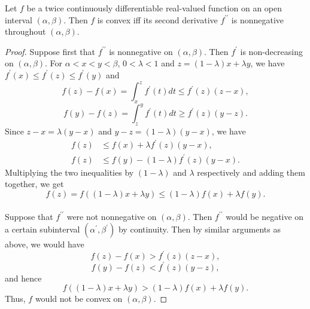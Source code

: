 \documentclass[11pt,a4paper]{article}
\begin{document}
\begin{theorem}\label{thm:convex_function_second_order}
    Let $f$ be a twice continuously differentiable real-valued function on an open interval $(\alpha,\beta)$. Then $f$ is convex iff its second derivative $f^{\prime\prime}$ is nonnegative throughout $(\alpha,\beta)$.
\end{theorem}

\begin{proof}
    \converse Suppose first that $f^{\prime\prime}$ is nonnegative on $(\alpha,\beta)$. Then $f^\prime$ is non-decreasing on $(\alpha,\beta)$. For $\alpha<x<y<\beta$, $0<\lambda<1$ and $z = (1-\lambda)x+\lambda y$, we have $f^\prime(x)\le f^\prime (z)\le f^\prime(y)$ and
    \begin{equation*}
        f(z) - f(x) = \int_x^z f^\prime (t)dt \le f^\prime(z)(z-x), 
    \end{equation*}
    \begin{equation*}
        f(y) - f(z) = \int_z^y f^\prime (t)dt \ge f^\prime(z)(y-z). 
    \end{equation*}
    Since $z-x = \lambda(y-x)$ and $y-z = (1-\lambda)(y-x)$, we have
    \begin{align*}
        f(z)&\le f(x) + \lambda f^\prime(z)(y-x),\\
        f(z)&\le f(y) - (1-\lambda) f^\prime(z)(y-x).
    \end{align*}
    Multiplying the two inequalities by $(1-\lambda)$ and $\lambda$ respectively and adding them together, we get
    \begin{equation*}
        f(z) = f((1-\lambda)x + \lambda y) \le (1-\lambda)f(x) + \lambda f(y).
    \end{equation*}
    \\
    \forward Suppose that $f^{\prime\prime}$ were not nonnegative on $(\alpha,\beta)$. Then $f^{\prime\prime}$ would be negative on a certain subinterval $(\alpha^\prime,\beta^\prime)$ by continuity. Then by similar arguments as above, we would have
    \begin{equation*}
        f(z) - f(x) > f^\prime (z)(z-x),
    \end{equation*} 
    \begin{equation*}
        f(y) - f(z) < f^\prime (z)(y-z),
    \end{equation*} 
    and hence 
    \begin{equation*}
        f((1-\lambda)x + \lambda y) > (1-\lambda)f(x) + \lambda f(y).
    \end{equation*}
    Thus, $f$ would not be convex on $(\alpha,\beta)$.
\end{proof}
\end{document}

